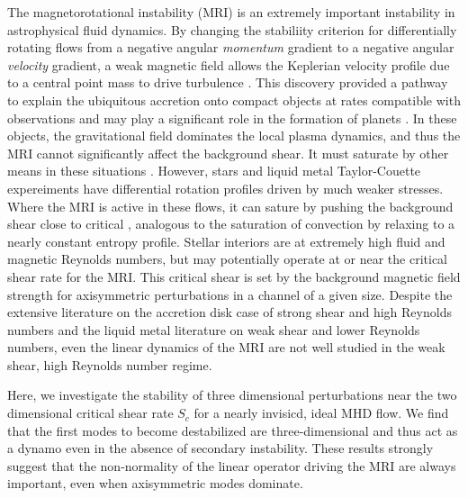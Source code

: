\documentclass[aps,prl,reprint,superscriptaddress]{revtex4-1}
\begin{document}
The magnetorotational instability (MRI) is an extremely important instability in astrophysical fluid dynamics.
By changing the stabiliity criterion for differentially rotating flows from a negative angular \emph{momentum} gradient to a negative angular \emph{velocity} gradient, a weak magnetic field allows the Keplerian velocity profile due to a central point mass to drive turbulence \citep[e.g.][]{1998RvMP...70....1B}.
This discovery provided a pathway to explain the ubiquitous accretion onto compact objects at rates compatible with observations and may play a significant role in the formation of planets \citep[e.g.][]{2007Natur.448.1022J}.
In these objects, the gravitational field dominates the local plasma dynamics, and thus the MRI cannot significantly affect the background shear.
It must saturate by other means in these situations \citep{2018MNRAS.474.3451X}.
However, stars and liquid metal Taylor-Couette expereiments have differential rotation profiles driven by much weaker stresses.
Where the MRI is active in these flows, it can sature by pushing the background shear close to critical \citep{2017ApJ...841....1C,2017ApJ...841....2C}, analogous to the saturation of convection by relaxing to a nearly constant entropy profile.
Stellar interiors are at extremely high fluid and magnetic Reynolds numbers, but may potentially operate at or near the critical shear rate for the MRI\@.
This critical shear is set by the background magnetic field strength for axisymmetric perturbations in a channel of a given size.
Despite the extensive literature on the accretion disk case of strong shear and high Reynolds numbers and the liquid metal literature on weak shear and lower Reynolds numbers, even the linear dynamics of the MRI are not well studied in the weak shear, high Reynolds number regime.

Here, we investigate the stability of three dimensional perturbations near the two dimensional critical shear rate $S_c$ for a nearly invisicd, ideal MHD flow.
We find that the first modes to become destabilized are three-dimensional and thus act as a dynamo even in the absence of secondary instability.
These results strongly suggest that the non-normality of the linear operator driving the MRI are always important, even when axisymmetric modes dominate.
\end{document}
